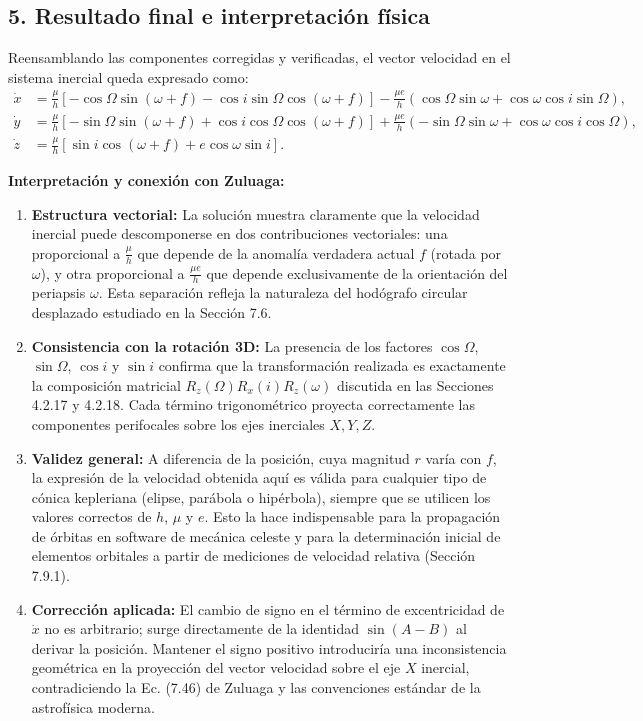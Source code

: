 \documentclass[12pt, a4paper]{article}
\begin{document}
\subsection*{5. Resultado final e interpretación física}
Reensamblando las componentes corregidas y verificadas, el vector velocidad en el sistema inercial queda expresado como:
\begin{align*}
\dot{x} &= \frac{\mu}{h} \left[ -\cos\Omega \sin(\omega+f) - \cos i \sin\Omega \cos(\omega+f) \right] - \frac{\mu e}{h} \left( \cos\Omega \sin\omega + \cos\omega \cos i \sin\Omega \right), \\
\dot{y} &= \frac{\mu}{h} \left[ -\sin\Omega \sin(\omega+f) + \cos i \cos\Omega \cos(\omega+f) \right] + \frac{\mu e}{h} \left( -\sin\Omega \sin\omega + \cos\omega \cos i \cos\Omega \right), \\
\dot{z} &= \frac{\mu}{h} \left[ \sin i \cos(\omega+f) + e \cos\omega \sin i \right].
\end{align*}

\textbf{Interpretación y conexión con Zuluaga:}
\begin{enumerate}
    \item \textbf{Estructura vectorial:} La solución muestra claramente que la velocidad inercial puede descomponerse en dos contribuciones vectoriales: una proporcional a $\frac{\mu}{h}$ que depende de la anomalía verdadera actual $f$ (rotada por $\omega$), y otra proporcional a $\frac{\mu e}{h}$ que depende exclusivamente de la orientación del periapsis $\omega$. Esta separación refleja la naturaleza del hodógrafo circular desplazado estudiado en la Sección 7.6.
    \item \textbf{Consistencia con la rotación 3D:} La presencia de los factores $\cos\Omega$, $\sin\Omega$, $\cos i$ y $\sin i$ confirma que la transformación realizada es exactamente la composición matricial $R_z(\Omega)R_x(i)R_z(\omega)$ discutida en las Secciones 4.2.17 y 4.2.18. Cada término trigonométrico proyecta correctamente las componentes perifocales sobre los ejes inerciales $X, Y, Z$.
    \item \textbf{Validez general:} A diferencia de la posición, cuya magnitud $r$ varía con $f$, la expresión de la velocidad obtenida aquí es válida para cualquier tipo de cónica kepleriana (elipse, parábola o hipérbola), siempre que se utilicen los valores correctos de $h$, $\mu$ y $e$. Esto la hace indispensable para la propagación de órbitas en software de mecánica celeste y para la determinación inicial de elementos orbitales a partir de mediciones de velocidad relativa (Sección 7.9.1).
    \item \textbf{Corrección aplicada:} El cambio de signo en el término de excentricidad de $\dot{x}$ no es arbitrario; surge directamente de la identidad $\sin(A-B)$ al derivar la posición. Mantener el signo positivo introduciría una inconsistencia geométrica en la proyección del vector velocidad sobre el eje $X$ inercial, contradiciendo la Ec. (7.46) de Zuluaga y las convenciones estándar de la astrofísica moderna.
\end{enumerate}
\end{document}

